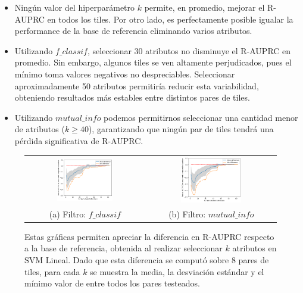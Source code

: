 \begin{itemize}
\item Ningún valor del hiperparámetro $k$ permite, en promedio, mejorar el R-AUPRC en todos los tiles. Por otro lado, es perfectamente posible igualar la performance de la base de referencia eliminando varios atributos.
\item Utilizando $f\_classif$, seleccionar 30 atributos no disminuye el R-AUPRC en promedio. Sin embargo, algunos tiles se ven altamente perjudicados, pues el mínimo toma valores negativos no despreciables. Seleccionar aproximadamente 50 atributos permitiría reducir esta variabilidad, obteniendo resultados más estables entre distintos pares de tiles.
\item Utilizando $mutual\_info$ podemos permitirnos seleccionar una cantidad menor de atributos ($k \geq 40$), garantizando que ningún par de tiles tendrá una pérdida significativa de R-AUPRC.
\end{itemize} 

\begin{figure}[h!]
\begin{tabular}{cc}
  \includegraphics[width=0.49\textwidth]{Kap5/linearBEST_K_f_classif.png} &   \includegraphics[width=0.49\textwidth]{Kap5/linearBEST_K_mutual_info_classif.png} \\
(a) Filtro: $f\_classif$ & (b) Filtro: $mutual\_info$
\end{tabular}
\caption{Estas gráficas permiten apreciar la diferencia en R-AUPRC respecto a la base de referencia, obtenida al realizar seleccionar $k$ atributos en SVM Lineal. Dado que esta diferencia se computó sobre 8 pares de tiles, para cada $k$ se muestra la media, la desviación estándar y el mínimo valor de entre todos los pares testeados. }
\label{fig:optimal_k_svml}
\end{figure}


